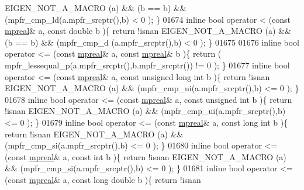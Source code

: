 \begin{DoxyCode}
      EIGEN\_NOT\_A\_MACRO (a) && (b == b) && (mpfr\_cmp\_ld(a.mpfr\_srcptr(),b) < 0 );    \}
01674 \textcolor{keyword}{inline} \textcolor{keywordtype}{bool} operator <  (\textcolor{keyword}{const} \hyperlink{classmpfr_1_1mpreal}{mpreal}& a, \textcolor{keyword}{const} \textcolor{keywordtype}{double} b            )\{  \textcolor{keywordflow}{return} !isnan 
      EIGEN\_NOT\_A\_MACRO (a) && (b == b) && (mpfr\_cmp\_d (a.mpfr\_srcptr(),b) < 0 );    \}
01675 
01676 \textcolor{keyword}{inline} \textcolor{keywordtype}{bool} operator <= (\textcolor{keyword}{const} \hyperlink{classmpfr_1_1mpreal}{mpreal}& a, \textcolor{keyword}{const} \hyperlink{classmpfr_1_1mpreal}{mpreal}& b           )\{  \textcolor{keywordflow}{return} (
      mpfr\_lessequal\_p(a.mpfr\_srcptr(),b.mpfr\_srcptr()) != 0 );          \}
01677 \textcolor{keyword}{inline} \textcolor{keywordtype}{bool} operator <= (\textcolor{keyword}{const} \hyperlink{classmpfr_1_1mpreal}{mpreal}& a, \textcolor{keyword}{const} \textcolor{keywordtype}{unsigned} \textcolor{keywordtype}{long} \textcolor{keywordtype}{int} b )\{  \textcolor{keywordflow}{return} !isnan 
      EIGEN\_NOT\_A\_MACRO (a) && (mpfr\_cmp\_ui(a.mpfr\_srcptr(),b) <= 0 );                \}
01678 \textcolor{keyword}{inline} \textcolor{keywordtype}{bool} operator <= (\textcolor{keyword}{const} \hyperlink{classmpfr_1_1mpreal}{mpreal}& a, \textcolor{keyword}{const} \textcolor{keywordtype}{unsigned} \textcolor{keywordtype}{int} b      )\{  \textcolor{keywordflow}{return} !isnan 
      EIGEN\_NOT\_A\_MACRO (a) && (mpfr\_cmp\_ui(a.mpfr\_srcptr(),b) <= 0 );                \}
01679 \textcolor{keyword}{inline} \textcolor{keywordtype}{bool} operator <= (\textcolor{keyword}{const} \hyperlink{classmpfr_1_1mpreal}{mpreal}& a, \textcolor{keyword}{const} \textcolor{keywordtype}{long} \textcolor{keywordtype}{int} b          )\{  \textcolor{keywordflow}{return} !isnan 
      EIGEN\_NOT\_A\_MACRO (a) && (mpfr\_cmp\_si(a.mpfr\_srcptr(),b) <= 0 );                \}
01680 \textcolor{keyword}{inline} \textcolor{keywordtype}{bool} operator <= (\textcolor{keyword}{const} \hyperlink{classmpfr_1_1mpreal}{mpreal}& a, \textcolor{keyword}{const} \textcolor{keywordtype}{int} b               )\{  \textcolor{keywordflow}{return} !isnan 
      EIGEN\_NOT\_A\_MACRO (a) && (mpfr\_cmp\_si(a.mpfr\_srcptr(),b) <= 0 );                \}
01681 \textcolor{keyword}{inline} \textcolor{keywordtype}{bool} operator <= (\textcolor{keyword}{const} \hyperlink{classmpfr_1_1mpreal}{mpreal}& a, \textcolor{keyword}{const} \textcolor{keywordtype}{long} \textcolor{keywordtype}{double} b       )\{  \textcolor{keywordflow}{return} !isnan 

\end{DoxyCode}

